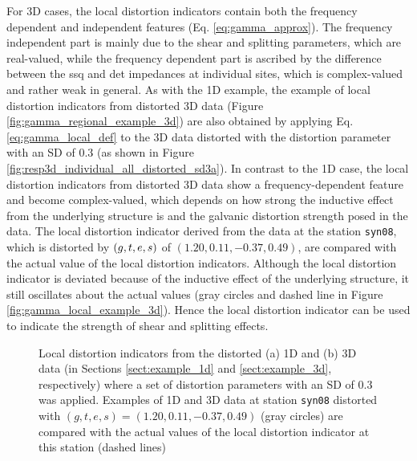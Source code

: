 	For 3D cases, the local distortion indicators contain both the frequency dependent and independent features (Eq. \ref{eq:gamma_approx}). The frequency independent part is mainly due to the shear and splitting parameters, which are real-valued, while the frequency dependent part is ascribed by the difference between the ssq and det impedances at individual sites, which is complex-valued and rather weak in general.
	As with the 1D example, the example of local distortion indicators from distorted 3D data (Figure \ref{fig:gamma_regional_example_3d}) are also obtained by applying Eq. \eqref{eq:gamma_local_def} to the 3D data distorted with the distortion parameter with an SD of 0.3 (as shown in Figure \ref{fig:resp3d_individual_all_distorted_sd3a}).
	In contrast to the 1D case, the local distortion indicators from distorted 3D data show a frequency-dependent feature and become complex-valued, which depends on how strong the inductive effect from the underlying structure is and the galvanic distortion strength posed in the data. 
	The local distortion indicator derived from the data at the station \texttt{syn08}, which is distorted by $(g,t,e,s)$ of $(1.20,0.11,-0.37,0.49)$, are compared with the actual value of the local distortion indicators.
	Although the local distortion indicator is deviated because of the inductive effect of the underlying structure, it still oscillates about the actual values (gray circles and dashed line in Figure \ref{fig:gamma_local_example_3d}). Hence the local distortion indicator can be used to indicate the strength of shear and splitting effects.

\begin{figure}[t]
	\centering
	\caption[Local distortion indicators from 1D and 3D data]{Local distortion indicators from the distorted (a) 1D and (b) 3D data (in Sections \ref{sect:example_1d} and \ref{sect:example_3d}, respectively) where a set of distortion parameters with an SD of 0.3 was applied. Examples of 1D and 3D data at station \texttt{syn08} distorted with $(g, t, e, s) = (1.20, 0.11, -0.37, 0.49)$ (gray circles) are compared with the actual values of the local distortion indicator at this station (dashed lines)}
	\label{fig:gamma_local_example}
\end{figure}

